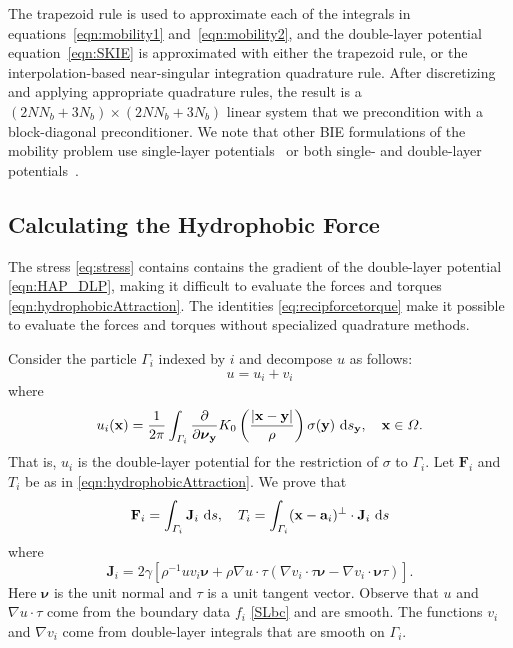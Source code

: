 \documentclass[lineno]{jfm}
\renewcommand{\aa}{\mathbf{a}}
\newcommand{\FF}{\mathbf{F}}
\newcommand{\JJ}{\mathbf{J}}
\newcommand{\nnu}{\boldsymbol{\nu}}
\newcommand{\xx}{\mathbf{x}}
\newcommand{\yy}{\mathbf{y}}
\newcommand{\pderiv}[2]{\frac{\partial #1}{\partial #2}}
\begin{document}
The trapezoid rule is used to approximate each of the integrals in
equations~\eqref{eqn:mobility1} and~\eqref{eqn:mobility2}, and the
double-layer potential equation~\eqref{eqn:SKIE} is approximated with
either the trapezoid rule, or the interpolation-based near-singular
integration quadrature rule. After discretizing and applying appropriate
quadrature rules, the result is a $(2NN_b + 3N_b) \times (2NN_b + 3N_b)$
linear system that we precondition with a block-diagonal preconditioner.
We note that other BIE formulations of the mobility problem use
single-layer potentials~\cite{cor-gre-rac-vee2017, rac-gre2016} or both
single- and double-layer potentials~\cite{cor-vee2018}.

\subsection{Calculating the Hydrophobic Force}
\label{subsec:calculating_force}
The stress \eqref{eq:stress} contains
contains the gradient of the double-layer potential \eqref{eqn:HAP_DLP},
making it difficult to evaluate
the forces and torques \eqref{eqn:hydrophobicAttraction}.
The identities \eqref{eq:recipforcetorque}
make it possible to evaluate the forces and torques
without specialized quadrature methods. 

Consider the particle
$\Gamma_i$ indexed by $i$
and decompose $u$ as follows: 
\begin{equation}
u = u_i + v_i
\end{equation}
where  
\begin{equation}
    u_i(\xx) = \frac{1}{2\pi} \int_{\Gamma_i} \pderiv{}{\nnu_\yy}
    K_0 \left(\frac{|\xx - \yy|}{\rho}\right) \sigma(\yy) \, \dif s_\yy,
    \quad \xx \in \Omega.
\end{equation}
That is, $u_i$ is the double-layer potential for the restriction of $\sigma$ to $\Gamma_i$.  Let $\FF_i$ and $T_i$ be as in \eqref{eqn:hydrophobicAttraction}. We prove that 
\begin{equation}
\label{eq:recipforcetorque}
\FF_i= \int_{\Gamma_i} \JJ_i \,\dif s,\quad
T_i= \int_{\Gamma_i} (\xx - \aa_i)^{\perp} \cdot \JJ_i  \,\dif s
\end{equation}
where
 \begin{equation}
\label{eq:jumpstress1}
\JJ_{i} = 2\gamma\left[\rho^{-1} u v_i \nnu 
+ \rho \nabla u \cdot \tau (\nabla v_i \cdot \tau \nnu -  \nabla
   v_i \cdot \nnu \tau)\right].
\end{equation}
Here $\nnu$ is the unit normal and $\tau$ is a unit tangent vector.
Observe that  $u$ and $\nabla u \cdot \tau$ come from the boundary data $f_i$ \eqref{SLbc} and are smooth. The functions $v_i$ and $\nabla v_i$
come from double-layer integrals that are smooth on $\Gamma_i$.
\end{document}
